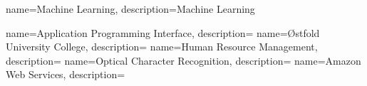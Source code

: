\RequirePackage{glossaries}
\makeglossaries


{
    name=Machine Learning,
    description={Machine Learning}
}

{
    name=Application Programming Interface,
    description={}
}
{
    name=Østfold University College,
    description={}
}
{
    name=Human Resource Management,
    description={}
}
{
    name=Optical Character Recognition,
    description={}
}
{
    name=Amazon Web Services,
    description={}
}
